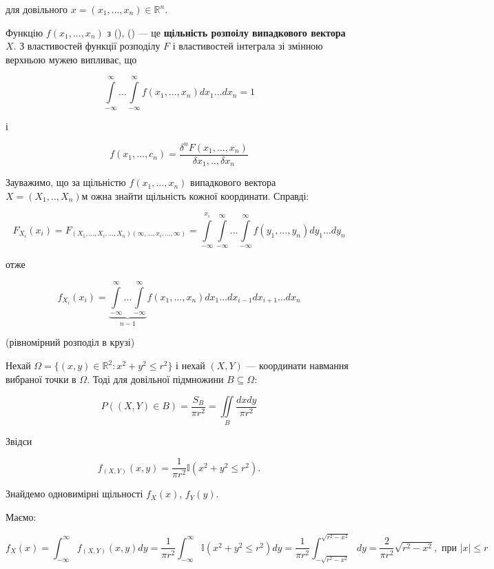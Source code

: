 для довільного $x = (x_1, ..., x_n) \in \mathbb{R}^n$.

Функцію $f(x_1, ..., x_n)$ з (), () --- це \textbf{щільність розпоілу випадкового вектора $X$}.
З властивостей функції розподілу $F$ і властивостей інтеграла зі змінною верхньою мужею випливає, що 

\begin{equation}
    \int\limits_{-\infty}^{\infty} ... \int\limits_{-\infty}^{\infty}
        f(x_1, ..., x_n)dx_1...dx_n
    = 1
\end{equation}

і

\begin{equation}
    f(x_1, ..., c_n)
    = \frac{\delta^n F(x_1, ..., x_n)}{\delta x_1, .., \delta x_n}
\end{equation}

Зауважимо, що за щільністю $f(x_1, ..., x_n)$ випадкового вектора $X = (X_1, .., X_n)$м
ожна знайти щільність кожної координати. Справді:

$$F_{X_i}(x_i)=
F_{(X_1, ..., X_i, ..., X_n)(\infty, ..., x_i, ..., \infty)}
= \int\limits_{-\infty}^{x_i} \int\limits_{-\infty}^{\infty} ... \int\limits_{-\infty}^{\infty}
    f(y_1, ..., y_n) dy_1 ... dy_n$$

отже

\begin{equation}
    f_{X_i}(x_i) = \underbrace{\int\limits_{-\infty}^{\infty} ... \int\limits_{-\infty}^{\infty}}_{n-1}
    f(x_1, ..., x_n) dx_1 ... dx_{i-1} dx_{i+1} ... dx_n
\end{equation}

\begin{example}(рівномірний розподіл в крузі)

\end{example}

Нехай $\Omega = \{(x, y) \in \mathbb{R}^2: x^2 + y^2 \leqslant r^2\}$ і нехай 
$(X, Y)$ --- координати навмання вибраної точки в $\Omega$. Тоді для довільної
підмножини $B \subseteq \Omega$:

$$P((X, Y) \in B)
= \frac{S_B}{\pi r^2}
= \iint\limits_{B} \frac{dx dy}{\pi r^2}$$

Звідси 

$$f_{(X, Y)} (x, y)
= \frac{1}{\pi r^2} \mathbb{I}(x^2 + y^2 \leqslant r^2).$$

Знайдемо одновимірні щільності $f_X(x)$, $f_Y(y)$.

Маємо:

$$f_X(x)
= \int_{-\infty}^{\infty} f_{(X, Y)}(x, y) dy
= \frac{1}{\pi r^2} \int_{-\infty}^{\infty} \mathbb{I}(x^2 + y^2 \leqslant r^2) dy
= \frac{1}{\pi r^2} \int_{-\sqrt{r^2 - x^2}}^{\sqrt{r^2 - x^2}} dy
= \frac{2}{\pi r^2}\sqrt{r^2 - x^2}, \text{ при } |x| \leqslant r$$

